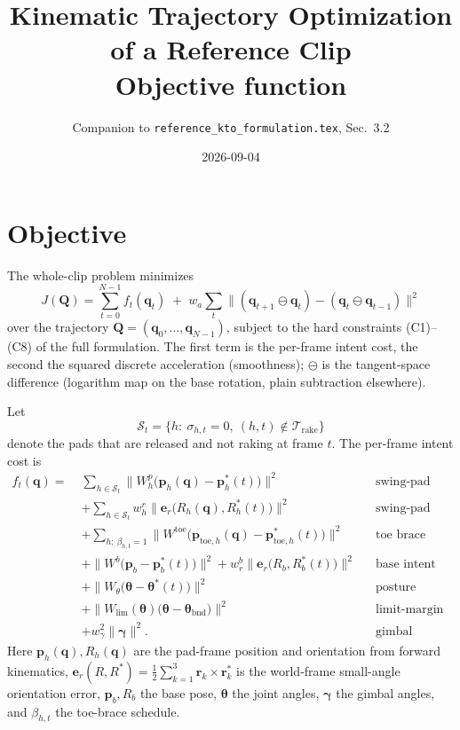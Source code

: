 \documentclass[11pt]{article}
\title{Kinematic Trajectory Optimization of a Reference Clip\\[3pt]\large Objective function}
\author{Companion to \texttt{reference\_kto\_formulation.tex}, Sec.~3.2}
\date{2026-09-04}
\begin{document}
\maketitle

\section*{Objective}

The whole-clip problem minimizes
\begin{equation}
J(\bm Q)=\sum_{t=0}^{N-1} f_t(\bm q_t)\;+\;w_a\sum_{t}\bigl\|(\bm q_{t+1}\ominus\bm q_t)-(\bm q_t\ominus\bm q_{t-1})\bigr\|^2
\label{eq:obj}
\end{equation}
over the trajectory $\bm Q=(\bm q_0,\dots,\bm q_{N-1})$, subject to the hard
constraints (C1)--(C8) of the full formulation. The first term is the
per-frame intent cost, the second the squared discrete acceleration
(smoothness); $\ominus$ is the tangent-space difference (logarithm map on the
base rotation, plain subtraction elsewhere).

Let
\begin{equation}
\mathcal S_t=\bigl\{h:\ \sigma_{h,t}=0,\ (h,t)\notin\mathcal T_{\mathrm{rake}}\bigr\}
\end{equation}
denote the pads that are released and not raking at frame $t$. The per-frame
intent cost is
\begin{equation}
\begin{aligned}
f_t(\bm q)=\;&\sum_{h\in\mathcal S_t}\bigl\|W^p_h\bigl(\bm p_h(\bm q)-\bm p^*_h(t)\bigr)\bigr\|^2
  && \text{swing-pad arc}\\
  &+\sum_{h\in\mathcal S_t} w^r_h\bigl\|\bm e_r\bigl(R_h(\bm q),R^*_h(t)\bigr)\bigr\|^2
  && \text{swing-pad orientation}\\
  &+\sum_{h:\ \beta_{h,t}=1}\bigl\|W^{\mathrm{toe}}\bigl(\bm p_{\mathrm{toe},h}(\bm q)-\bm p^*_{\mathrm{toe},h}(t)\bigr)\bigr\|^2
  && \text{toe brace}\\
  &+\bigl\|W^b\bigl(\bm p_b-\bm p^*_b(t)\bigr)\bigr\|^2+w^b_r\bigl\|\bm e_r\bigl(R_b,R^*_b(t)\bigr)\bigr\|^2
  && \text{base intent}\\
  &+\bigl\|W_\theta\bigl(\bm\theta-\bm\theta^*(t)\bigr)\bigr\|^2
  && \text{posture reference}\\
  &+\bigl\|W_{\mathrm{lim}}(\bm\theta)\bigl(\bm\theta-\bm\theta_{\mathrm{bnd}}\bigr)\bigr\|^2
  && \text{limit-margin spring}\\
  &+w_\gamma^2\|\bm\gamma\|^2 .
  && \text{gimbal return}
\end{aligned}
\label{eq:ft}
\end{equation}
Here $\bm p_h(\bm q),R_h(\bm q)$ are the pad-frame position and orientation
from forward kinematics, $\bm e_r(R,R^*)=\tfrac12\sum_{k=1}^{3}\bm r_k\times\bm r^*_k$
is the world-frame small-angle orientation error, $\bm p_b,R_b$ the base
pose, $\bm\theta$ the joint angles, $\bm\gamma$ the gimbal angles, and
$\beta_{h,t}$ the toe-brace schedule.
\end{document}
